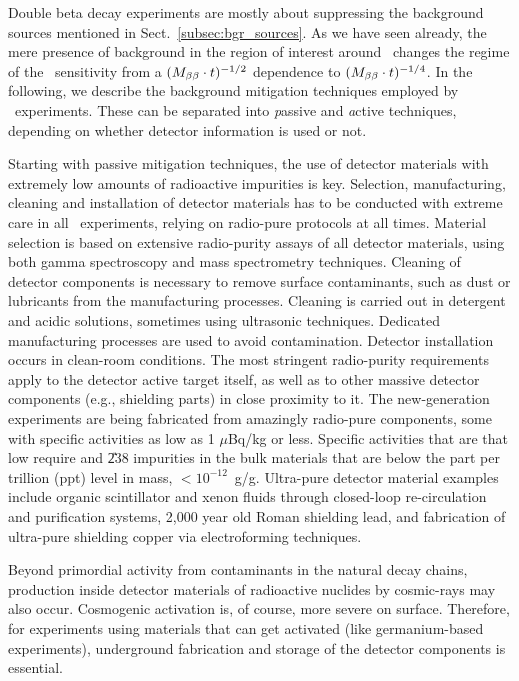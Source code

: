 Double beta decay experiments are mostly about suppressing the background sources mentioned in Sect.~\ref{subsec:bgr_sources}. As we have seen already, the mere presence of background in the region of interest around \Qbb\ changes the regime of the \mbb\ sensitivity from a $(M_{\beta\beta} \cdot t)^{-1/2}$ dependence to $(M_{\beta\beta} \cdot t)^{-1/4}$. In the following, we describe the background mitigation techniques employed by \bbonu\ experiments. These can be separated into {\emph passive} and {\emph active} techniques, depending on whether detector information is used or not.

Starting with passive mitigation techniques, the use of detector materials with extremely low amounts of radioactive impurities is key. Selection, manufacturing, cleaning and installation of detector materials has to be conducted with extreme care in all \bbonu\ experiments, relying on radio-pure protocols at all times. Material selection is based on extensive radio-purity assays of all detector materials, using both gamma spectroscopy and mass spectrometry techniques. Cleaning of detector components is necessary to remove surface contaminants, such as dust or lubricants from the manufacturing processes. Cleaning is carried out in detergent and acidic solutions, sometimes using ultrasonic techniques. Dedicated manufacturing processes are used to avoid contamination. Detector installation occurs in clean-room conditions. The most stringent radio-purity requirements apply to the detector active target itself, as well as to other massive detector components (e.g., shielding parts) in close proximity to it. The new-generation experiments are being fabricated from amazingly radio-pure components, some with specific activities as low as 1 $\mu$Bq/kg or less. Specific activities that are that low require  and \U{238} impurities in the bulk materials that are below the part per trillion (ppt) level in mass, $<10^{-12}$~g/g. Ultra-pure detector material examples include organic scintillator and xenon fluids through closed-loop re-circulation and purification systems, 2,000 year old Roman shielding lead, and fabrication of ultra-pure shielding copper via electroforming techniques.

Beyond primordial activity from contaminants in the natural decay chains, production inside detector materials of radioactive nuclides by cosmic-rays may also occur. Cosmogenic activation is, of course, more severe on surface. Therefore, for experiments using materials that can get activated (like germanium-based experiments), underground fabrication and storage of the detector components is essential.

